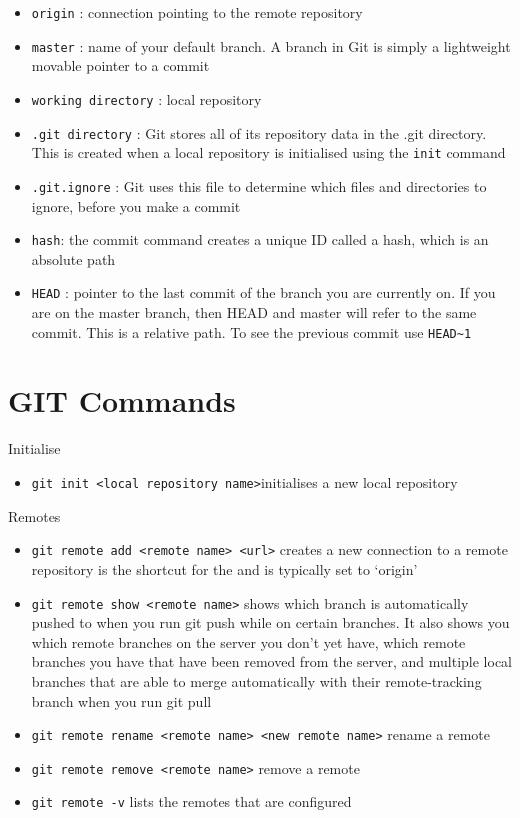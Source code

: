\documentclass[
]{book}
\providecommand{\tightlist}{%
  \setlength{\itemsep}{0pt}\setlength{\parskip}{0pt}}
\begin{document}
\begin{itemize}
\item
  \texttt{origin} : connection pointing to the remote repository
\item
  \texttt{master} : name of your default branch. A branch in Git is simply a lightweight movable pointer to a commit
\item
  \texttt{working\ directory} : local repository
\item
  \texttt{.git\ directory} : Git stores all of its repository data in the .git directory. This is created when a local repository is initialised using the \texttt{init} command
\item
  \texttt{.git.ignore} : Git uses this file to determine which files and directories to ignore, before you make a commit
\item
  \texttt{hash}: the commit command creates a unique ID called a hash, which is an absolute path
\item
  \texttt{HEAD} : pointer to the last commit of the branch you are currently on. If you are on the master branch, then HEAD and master will refer to the same commit. This is a relative path. To see the previous commit use \texttt{HEAD\textasciitilde{}1}
\end{itemize}

\hypertarget{git-commands-1}{%
\section{GIT Commands}\label{git-commands-1}}

Initialise

\begin{itemize}
\tightlist
\item
  \texttt{git\ init\ \textless{}local\ repository\ name\textgreater{}}initialises a new local repository
\end{itemize}

Remotes

\begin{itemize}
\tightlist
\item
  \texttt{git\ remote\ add\ \textless{}remote\ name\textgreater{}\ \textless{}url\textgreater{}} creates a new connection to a remote repository is the shortcut for the and is typically set to `origin'
\item
  \texttt{git\ remote\ show\ \textless{}remote\ name\textgreater{}} shows which branch is automatically pushed to when you run git push while on certain branches. It also shows you which remote branches on the server you don't yet have, which remote branches you have that have been removed from the server, and multiple local branches that are able to merge automatically with their remote-tracking branch when you run git pull
\item
  \texttt{git\ remote\ rename\ \textless{}remote\ name\textgreater{}\ \textless{}new\ remote\ name\textgreater{}} rename a remote
\item
  \texttt{git\ remote\ remove\ \textless{}remote\ name\textgreater{}} remove a remote
\item
  \texttt{git\ remote\ -v} lists the remotes that are configured
\end{itemize}
\end{document}
